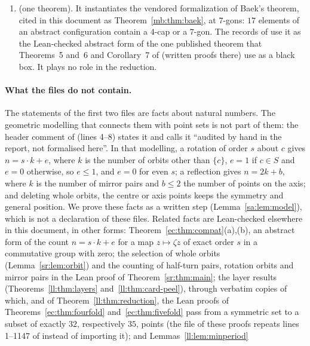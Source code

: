 \begin{enumerate}[label=(\arabic*)]
  (); the report's description of the file, at its line~106, does not mention this lemma.
\item {} (one theorem). It instantiates the vendored formalization
   of Baek's theorem, cited in this document as Theorem~\ref{mb:thm:baek}, at $7$-gons: $17$ elements of
  an abstract configuration contain a $4$-cap or a $7$-gon. The records of  use it as the Lean-checked
  abstract form of the one published theorem that Theorems~5 and~6 and Corollary~7 of 
  (written proofs there) use as a black box. It plays no role in the reduction.
\end{enumerate}

\paragraph{What the files do not contain.}
The statements of the first two files are facts about natural numbers. The geometric modelling that connects them
with point sets is not part of them: the header comment of  (lines 4--8) states it and calls it
``audited by hand in the report, not formalised here''. In that modelling, a rotation of order $s$ about $c$ gives
$n=s\cdot k+e$, where $k$ is the number of orbits other than $\{c\}$, $e=1$ if $c\in S$ and $e=0$ otherwise, so
$e\le1$, and $e=0$ for even $s$; a reflection gives $n=2k+b$, where $k$ is the number of mirror pairs and $b\le2$ the
number of points on the axis; and deleting whole orbits, the centre or axis points keeps the symmetry and general
position. We prove these facts as a written step (Lemma~\ref{sa:lem:model}), which is not a declaration of these
files. Related facts are Lean-checked elsewhere in this document, in other forms: Theorem~\ref{ec:thm:compat}(a),(b),
an abstract form of the count $n=s\cdot k+e$ for a map $z\mapsto\zeta z$ of exact order $s$ in a commutative group
with zero; the selection of whole orbits (Lemma~\ref{sr:lem:orbit}) and the counting of half-turn pairs, rotation
orbits and mirror pairs in the Lean proof of Theorem~\ref{sr:thm:main}; the layer results
(Theorems~\ref{ll:thm:layers} and~\ref{ll:thm:card-peel}), through verbatim copies of which, and of
Theorem~\ref{ll:thm:reduction}, the Lean proofs of Theorems~\ref{ec:thm:fourfold} and~\ref{ec:thm:fivefold} pass
from a symmetric set to a subset of exactly $32$, respectively $35$, points (the file of these proofs repeats
lines 1--1147 of  instead of importing it); and Lemmas~\ref{ll:lem:minperiod}
